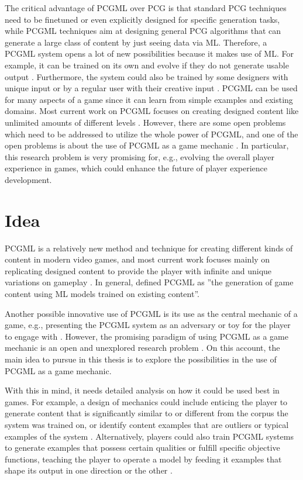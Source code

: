 \documentclass[MGS,Master,english]{twbook}%
\begin{document}
The critical advantage of PCGML over PCG is that standard PCG techniques need to be finetuned or even explicitly designed for specific generation tasks, while PCGML techniques aim at designing general PCG algorithms that can generate a large class of content by just seeing data via ML. Therefore, a \ac{PCGML} system opens a lot of new possibilities because it makes use of ML. For example, it can be trained on its own and evolve if they do not generate usable output \cite{pcgml::paper}. Furthermore, the system could also be trained by some designers with unique input or by a regular user with their creative input \cite{pcgml::paper}. \ac{PCGML} can be used for many aspects of a game since it can learn from simple examples and existing domains. Most current work on PCGML focuses on creating designed content like unlimited amounts of different levels \cite{pcgml::paper}. However, there are some open problems which need to be addressed to utilize the whole power of PCGML, and one of the open problems is about the use of PCGML as a game mechanic \cite{pcgml::paper}. In particular, this research problem is very promising for, e.g., evolving the overall player experience in games, which could enhance the future of player experience development.

\section{Idea}
\ac{PCGML} is a relatively new method and technique for creating different kinds of content in modern video games, and most current work focuses mainly on replicating designed content to provide the player with infinite and unique variations on gameplay \cite{pcgml::paper}. In general, \citep{pcgml::paper} defined PCGML as ''the generation of game content using ML models trained on existing content''. 

Another possible innovative use of PCGML is its use as the central mechanic of a game, e.g., presenting the PCGML system as an adversary or toy for the player to engage with  \cite{pcgml::paper}. However, the promising paradigm of using PCGML as a game mechanic is an open and unexplored research problem \cite{pcgml::paper}. On this account, the main idea to pursue in this thesis is to explore the possibilities in the use of PCGML as a game mechanic.

With this in mind, it needs detailed analysis on how it could be used best in games. For example, a design of mechanics could include enticing the player to generate content that is significantly similar to or different from the corpus the system was trained on, or identify content examples that are outliers or typical examples of the system \cite{pcgml::paper}. Alternatively, players could also train \ac{PCGML} systems to generate examples that possess certain qualities or fulfill specific objective functions, teaching the player to operate a model by feeding it examples that shape its output in one direction or the other \cite{pcgml::paper}.
\end{document}
